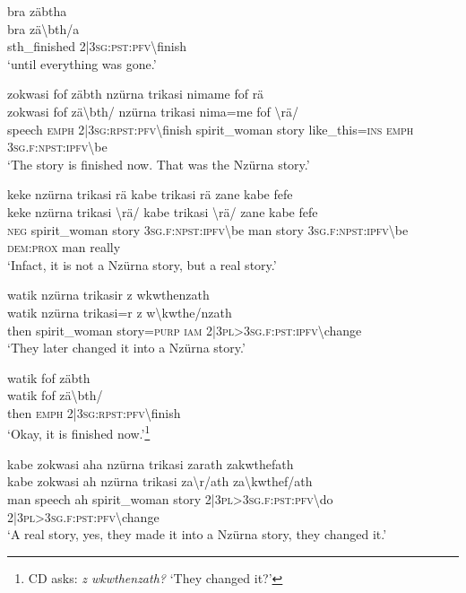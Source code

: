 \ea\label{ex:6:a1327}
bra zäbtha\\
\gll bra	zä{\textbackslash}bth/a\\
     sth\_finished	2|3\textsc{sg}:\textsc{pst}:\textsc{pfv}{\textbackslash}finish\\
\glt `until everything was gone.'
\z

\newpage
\ea\label{ex:6:a1328}
zokwasi fof zäbth nzürna trikasi nimame fof rä\\
\gll zokwasi	fof	zä{\textbackslash}bth/	nzürna	trikasi	nima=me	fof	{\textbackslash}rä/\\
     speech	\textsc{emph}	2|3\textsc{sg}:\textsc{rpst}:\textsc{pfv}{\textbackslash}finish	spirit\_woman	story	like\_this=\textsc{ins}	\textsc{emph}	3\textsc{sg}.\textsc{f}:\textsc{npst}:\textsc{ipfv}{\textbackslash}be\\
\glt `The story is finished now. That was the Nzürna story.'
\z

\ea\label{ex:6:a1329}
keke nzürna trikasi rä kabe trikasi rä zane kabe fefe\\
\gll keke	nzürna	trikasi	{\textbackslash}rä/	kabe	trikasi	{\textbackslash}rä/	zane	kabe	fefe\\
     \textsc{neg}	spirit\_woman	story	3\textsc{sg}.\textsc{f}:\textsc{npst}:\textsc{ipfv}{\textbackslash}be	man	story	3\textsc{sg}.\textsc{f}:\textsc{npst}:\textsc{ipfv}{\textbackslash}be	\textsc{dem}:\textsc{prox}	man	really\\
\glt `Infact, it is not a Nzürna story, but a real story.'
\z

\ea\label{ex:6:a1331}
watik nzürna trikasir z wkwthenzath\\
\gll watik	nzürna	trikasi=r	z	w{\textbackslash}kwthe/nzath\\
     then	spirit\_woman	story=\textsc{purp}	\textsc{iam}	2|3\textsc{pl}>3\textsc{sg}.\textsc{f}:\textsc{pst}:\textsc{ipfv}{\textbackslash}change\\
\glt `They later changed it into a Nzürna story.'
\z

\ea\label{ex:6:a1333}
watik fof zäbth\\
\gll watik	fof	zä{\textbackslash}bth/\\
     then	\textsc{emph}	2|3\textsc{sg}:\textsc{rpst}:\textsc{pfv}{\textbackslash}finish\\
\glt `Okay, it is finished now.'\footnote{CD asks: \textit{z wkwthenzath?} `They changed it?'}
\z

\ea\label{ex:6:a1334}
kabe zokwasi aha nzürna trikasi zarath zakwthefath\\
\gll kabe	zokwasi	ah	nzürna	trikasi	za{\textbackslash}r/ath	za{\textbackslash}kwthef/ath\\
     man	speech	ah	spirit\_woman	story	2|3\textsc{pl}>3\textsc{sg}.\textsc{f}:\textsc{pst}:\textsc{pfv}{\textbackslash}do	2|3\textsc{pl}>3\textsc{sg}.\textsc{f}:\textsc{pst}:\textsc{pfv}{\textbackslash}change\\
\glt `A real story, yes, they made it into a Nzürna story, they changed it.'
\z

